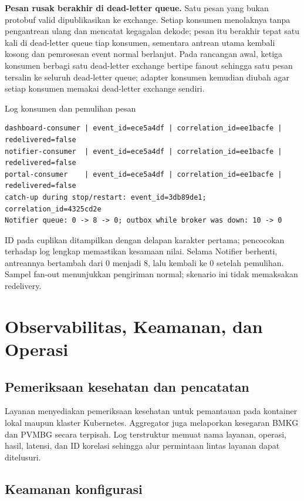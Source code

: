 \documentclass{fairmeta}
\begin{document}
\textbf{Pesan rusak berakhir di dead-letter queue.} Satu pesan yang bukan protobuf valid dipublikasikan ke exchange. Setiap konsumen menolaknya tanpa pengantrean ulang dan mencatat kegagalan dekode; pesan itu berakhir tepat satu kali di dead-letter queue tiap konsumen, sementara antrean utama kembali kosong dan pemrosesan event normal berlanjut. Pada rancangan awal, ketiga konsumen berbagi satu dead-letter exchange bertipe fanout sehingga satu pesan tersalin ke seluruh dead-letter queue; adapter konsumen kemudian diubah agar setiap konsumen memakai dead-letter exchange sendiri.

\begin{evidencebox}{Log konsumen dan pemulihan pesan}
\begin{lstlisting}
dashboard-consumer | event_id=ece5a4df | correlation_id=ee1bacfe | redelivered=false
notifier-consumer  | event_id=ece5a4df | correlation_id=ee1bacfe | redelivered=false
portal-consumer    | event_id=ece5a4df | correlation_id=ee1bacfe | redelivered=false
catch-up during stop/restart: event_id=3db89de1; correlation_id=4325cd2e
Notifier queue: 0 -> 8 -> 0; outbox while broker was down: 10 -> 0
\end{lstlisting}
\noindent\small ID pada cuplikan ditampilkan dengan delapan karakter pertama; pencocokan terhadap log lengkap memastikan kesamaan nilai. Selama Notifier berhenti, antreannya bertambah dari 0 menjadi 8, lalu kembali ke 0 setelah pemulihan. Sampel fan-out menunjukkan pengiriman normal; skenario ini tidak memaksakan redelivery.
\end{evidencebox}

\section{Observabilitas, Keamanan, dan Operasi}

\subsection{Pemeriksaan kesehatan dan pencatatan}

Layanan menyediakan pemeriksaan kesehatan untuk pemantauan pada kontainer lokal maupun klaster Kubernetes. Aggregator juga melaporkan kesegaran BMKG dan PVMBG secara terpisah. Log terstruktur memuat nama layanan, operasi, hasil, latensi, dan ID korelasi sehingga alur permintaan lintas layanan dapat ditelusuri.

\subsection{Keamanan konfigurasi}
\end{document}
